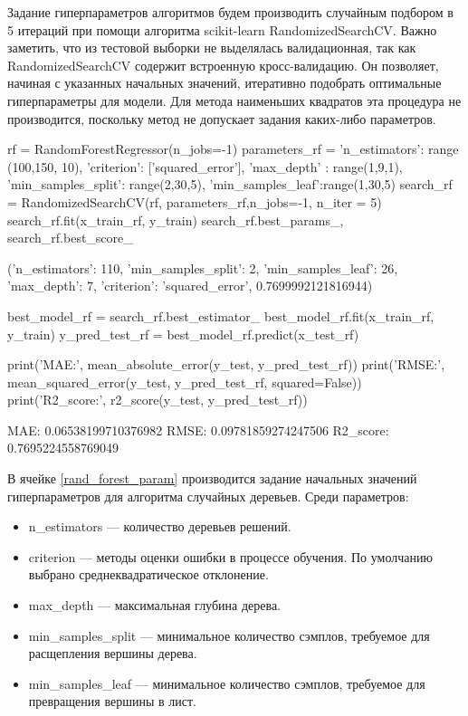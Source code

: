 Задание гиперпараметров алгоритмов \cite{feurer2019hyperparameter} будем производить случайным подбором в 5 итераций при помощи алгоритма scikit-learn RandomizedSearchCV. Важно заметить, что из тестовой выборки не выделялась валидационная, так как RandomizedSearchCV содержит встроенную кросс-валидацию. Он позволяет, начиная с указанных начальных значений, итеративно подобрать оптимальные гиперпараметры для модели. Для метода наименьших квадратов эта процедура не производится, поскольку метод не допускает задания каких-либо параметров.
\begin{pyin}
rf = RandomForestRegressor(n_jobs=-1)
parameters_rf = {'n_estimators': range (100,150, 10),
    'criterion':  ['squared_error'],
    'max_depth' : range(1,9,1),
    'min_samples_split': range(2,30,5),
    'min_samples_leaf':range(1,30,5)
}
search_rf = RandomizedSearchCV(rf, parameters_rf,n_jobs=-1, n_iter = 5)
search_rf.fit(x_train_rf, y_train)
search_rf.best_params_, search_rf.best_score_
\end{pyin}
\begin{pyprint}
({'n_estimators': 110,
    'min_samples_split': 2,
    'min_samples_leaf': 26,
    'max_depth': 7,
    'criterion': 'squared_error'},
0.7699992121816944)
\end{pyprint}
\begin{pyin}
best_model_rf = search_rf.best_estimator_
best_model_rf.fit(x_train_rf, y_train)
y_pred_test_rf = best_model_rf.predict(x_test_rf)

print('MAE:', mean_absolute_error(y_test, y_pred_test_rf))
print('RMSE:', mean_squared_error(y_test, y_pred_test_rf, squared=False))
print('R2_score:', r2_score(y_test, y_pred_test_rf))
\end{pyin}
\begin{pyprint}
MAE: 0.06538199710376982
RMSE: 0.09781859274247506
R2_score: 0.7695224558769049
\end{pyprint}
В ячейке \ref{rand_forest_param} производится задание начальных значений гиперпараметров для алгоритма случайных деревьев. Среди параметров:
\begin{itemize}
	\item n\_estimators --- количество деревьев решений.
	\item criterion --- методы оценки ошибки в процессе обучения. По умолчанию выбрано среднеквадратическое отклонение.
	\item max\_depth --- максимальная глубина дерева.
	\item min\_samples\_split --- минимальное количество сэмплов, требуемое для расщепления вершины дерева.
	\item min\_samples\_leaf --- минимальное количество сэмплов, требуемое для превращения вершины в лист.
\end{itemize}

